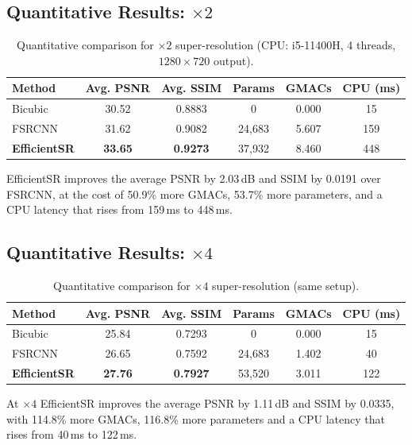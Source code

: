 \documentclass[11pt]{article}
\begin{document}
\subsection{Quantitative Results: $\times2$}
\begin{table}[htbp]
\centering
\caption{Quantitative comparison for $\times2$ super-resolution (CPU: i5-11400H, 4 threads, $1280\times720$ output).}
\label{tab:x2_results}
\small
\begin{tabular}{@{}lccccc@{}}
\toprule
\textbf{Method} & \textbf{Avg. PSNR} & \textbf{Avg. SSIM} & \textbf{Params} & \textbf{GMACs} & \textbf{CPU (ms)} \\
\midrule
Bicubic & 30.52 & 0.8883 & 0 & 0.000 & 15 \\
FSRCNN & 31.62 & 0.9082 & 24,683 & 5.607 & 159 \\
\textbf{EfficientSR} & \textbf{33.65} & \textbf{0.9273} & 37,932 & 8.460 & 448 \\
\bottomrule
\end{tabular}
\end{table}

EfficientSR improves the average PSNR by 2.03\,dB and SSIM by 0.0191 over FSRCNN, at the cost of 50.9\% more GMACs, 53.7\% more parameters, and a CPU latency that rises from 159\,ms to 448\,ms.

\subsection{Quantitative Results: $\times4$}
\begin{table}[htbp]
\centering
\caption{Quantitative comparison for $\times4$ super-resolution (same setup).}
\label{tab:x4_results}
\small
\begin{tabular}{@{}lccccc@{}}
\toprule
\textbf{Method} & \textbf{Avg. PSNR} & \textbf{Avg. SSIM} & \textbf{Params} & \textbf{GMACs} & \textbf{CPU (ms)} \\
\midrule
Bicubic & 25.84 & 0.7293 & 0 & 0.000 & 15 \\
FSRCNN & 26.65 & 0.7592 & 24,683 & 1.402 & 40 \\
\textbf{EfficientSR} & \textbf{27.76} & \textbf{0.7927} & 53,520 & 3.011 & 122 \\
\bottomrule
\end{tabular}
\end{table}

At $\times4$ EfficientSR improves the average PSNR by 1.11\,dB and SSIM by 0.0335, with 114.8\% more GMACs, 116.8\% more parameters and a CPU latency that rises from 40\,ms to 122\,ms.
\end{document}
